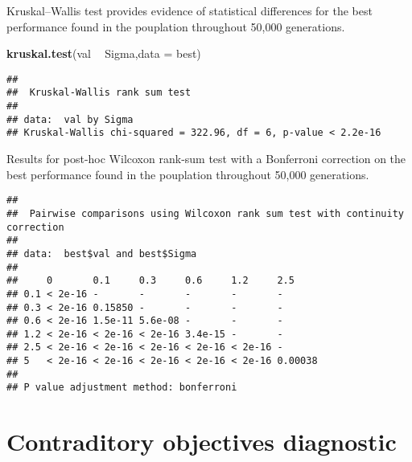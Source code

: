 \documentclass[]{book}
\newenvironment{Shaded}{\begin{snugshade}}{\end{snugshade}}
\newcommand{\DataTypeTok}[1]{\textcolor[rgb]{0.13,0.29,0.53}{#1}}
\newcommand{\KeywordTok}[1]{\textcolor[rgb]{0.13,0.29,0.53}{\textbf{#1}}}
\newcommand{\NormalTok}[1]{#1}
\newcommand{\OperatorTok}[1]{\textcolor[rgb]{0.81,0.36,0.00}{\textbf{#1}}}
\newcommand{\OtherTok}[1]{\textcolor[rgb]{0.56,0.35,0.01}{#1}}
\newcommand{\StringTok}[1]{\textcolor[rgb]{0.31,0.60,0.02}{#1}}
\begin{document}
Kruskal--Wallis test provides evidence of statistical differences for the best performance found in the pouplation throughout 50,000 generations.

\begin{Shaded}
\begin{Highlighting}[]
\KeywordTok{kruskal.test}\NormalTok{(val }\OperatorTok{~}\StringTok{ }\NormalTok{Sigma,}\DataTypeTok{data =}\NormalTok{ best)}
\end{Highlighting}
\end{Shaded}

\begin{verbatim}
## 
##  Kruskal-Wallis rank sum test
## 
## data:  val by Sigma
## Kruskal-Wallis chi-squared = 322.96, df = 6, p-value < 2.2e-16
\end{verbatim}

Results for post-hoc Wilcoxon rank-sum test with a Bonferroni correction on the best performance found in the pouplation throughout 50,000 generations.

\begin{Shaded}
\end{Shaded}

\begin{verbatim}
## 
##  Pairwise comparisons using Wilcoxon rank sum test with continuity correction 
## 
## data:  best$val and best$Sigma 
## 
##     0       0.1     0.3     0.6     1.2     2.5    
## 0.1 < 2e-16 -       -       -       -       -      
## 0.3 < 2e-16 0.15850 -       -       -       -      
## 0.6 < 2e-16 1.5e-11 5.6e-08 -       -       -      
## 1.2 < 2e-16 < 2e-16 < 2e-16 3.4e-15 -       -      
## 2.5 < 2e-16 < 2e-16 < 2e-16 < 2e-16 < 2e-16 -      
## 5   < 2e-16 < 2e-16 < 2e-16 < 2e-16 < 2e-16 0.00038
## 
## P value adjustment method: bonferroni
\end{verbatim}

\hypertarget{contraditory-objectives-diagnostic-1}{%
\section{Contraditory objectives diagnostic}\label{contraditory-objectives-diagnostic-1}}
\end{document}
